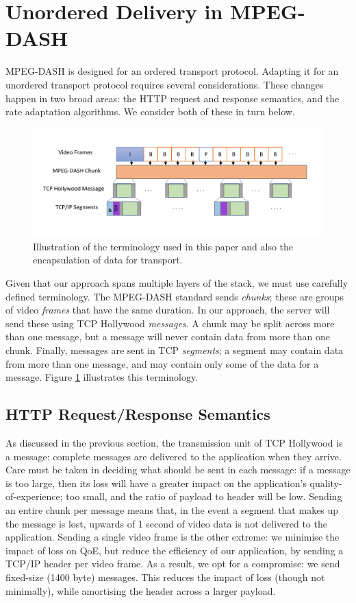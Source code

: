 \section{Unordered Delivery in MPEG-DASH}
\label{sec:transport}

MPEG-DASH is designed for an ordered transport protocol. Adapting it for an
unordered transport protocol requires several considerations. These
changes happen in two broad areas: the HTTP request and response semantics, and the rate
adaptation algorithms. We consider both of these in turn below.

\begin{figure}
  \centering
  \includegraphics[width=\columnwidth]{figures/terminology2.pdf}
  \caption{Illustration of the terminology used in this paper and also the encapsulation of data for transport.}
  \label{fig:terminology}
\end{figure}

Given that our approach spans multiple layers of the stack, we must use carefully defined
terminology. The MPEG-DASH standard sends \emph{chunks}; these are groups of video
\emph{frames} that have the same duration. In our approach, the server will send these
using TCP Hollywood \emph{messages}. A chunk may be split across more than one message,
but a message will never contain data from more than one chunk. Finally, messages are
sent in TCP \emph{segments}; a segment may contain data from more than one message, and
may contain only some of the data for a message.
Figure \ref{fig:terminology} illustrates this terminology.

\subsection{HTTP Request/Response Semantics}

As discussed in the previous section, the transmission unit of TCP Hollywood is a message:
complete messages are delivered to the application when they arrive. Care must be taken in
deciding what should be sent in each message: if a message is too large, then its loss
will have a greater impact on the application's quality-of-experience; too small, and the
ratio of payload to header will be low. Sending an entire chunk per message means that,
in the event a segment that makes up the message is lost, upwards of 1 second of video
data is not delivered to the application. Sending a single video frame is the
other extreme: we minimise the impact of loss on QoE, but reduce the efficiency of our
application, by sending a TCP/IP header per video frame. As a result, we opt for a
compromise: we send fixed-size (1400 byte) messages. This reduces the impact of loss 
(though not minimally), while amortising the header across a larger payload.

